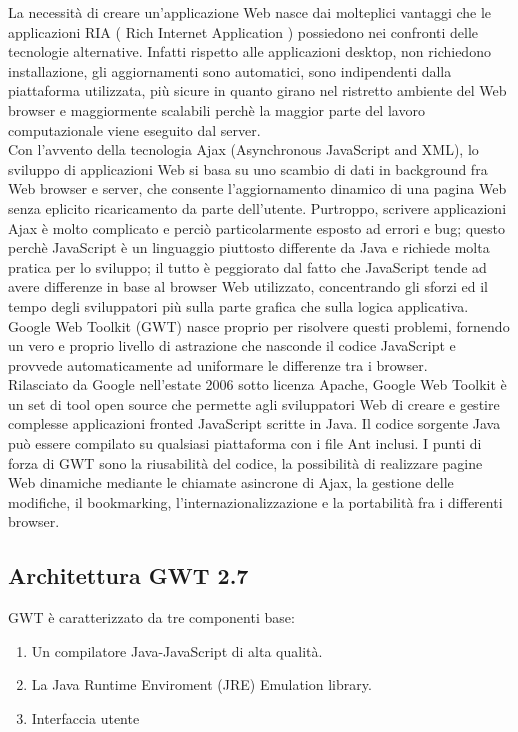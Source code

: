 La necessit\`a di creare un'applicazione Web nasce dai molteplici vantaggi che le applicazioni RIA ( Rich Internet Application ) possiedono nei confronti delle tecnologie alternative. Infatti rispetto alle applicazioni desktop, non richiedono installazione, gli aggiornamenti sono automatici, sono indipendenti dalla piattaforma utilizzata, pi\`u sicure in quanto girano nel ristretto ambiente del Web browser e maggiormente scalabili perch\`e la maggior parte del lavoro computazionale viene eseguito dal server.\\
Con l'avvento della tecnologia Ajax (Asynchronous JavaScript and XML), lo sviluppo di applicazioni Web si basa su uno scambio di dati in background fra Web browser e server, che
consente l'aggiornamento dinamico di una pagina Web senza eplicito ricaricamento da parte dell'utente. Purtroppo, scrivere applicazioni Ajax \`e molto complicato e perci\`o particolarmente esposto ad errori e bug; questo perch\`e JavaScript \`e un linguaggio piuttosto differente da Java e richiede molta pratica per lo sviluppo; il tutto \`e peggiorato dal fatto che JavaScript tende ad avere differenze in base al browser Web utilizzato, concentrando gli sforzi ed il tempo degli sviluppatori pi\`u sulla parte grafica che sulla logica applicativa. Google Web Toolkit (GWT) nasce proprio per risolvere questi problemi, fornendo un vero e proprio livello di astrazione che nasconde il codice JavaScript e provvede automaticamente ad uniformare le differenze tra i browser. \\
Rilasciato da Google nell'estate 2006 sotto licenza Apache, Google Web Toolkit \`e un set di tool open source che permette agli sviluppatori Web di creare e gestire complesse applicazioni fronted JavaScript scritte in Java. Il codice sorgente Java pu\`o essere compilato su qualsiasi piattaforma con i file Ant inclusi. I punti di forza di GWT sono la riusabilit\`a del codice, la possibilit\`a di realizzare pagine Web dinamiche mediante le chiamate asincrone di Ajax, la gestione delle modifiche, il bookmarking, l'internazionalizzazione e la portabilit\`a fra i differenti browser. 
\subsection{Architettura GWT 2.7}
GWT \`e caratterizzato da tre componenti base:
\begin{enumerate}
\item Un compilatore Java-JavaScript di alta qualit\`a.
\item La Java Runtime Enviroment (JRE) Emulation library.
\item Interfaccia utente
\end{enumerate}
